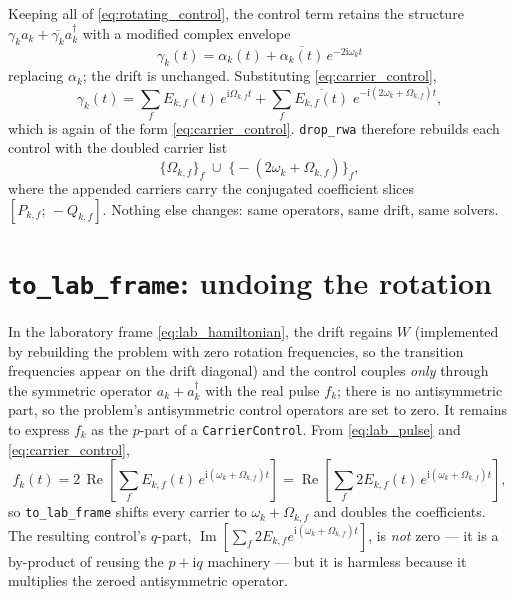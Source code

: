 \documentclass[11pt]{article}
\newcommand{\ii}{\mathrm{i}}
\renewcommand{\Re}{\operatorname{Re}}
\renewcommand{\Im}{\operatorname{Im}}
\newcommand{\code}[1]{\texttt{#1}}
\begin{document}
Keeping all of \eqref{eq:rotating_control}, the control term retains the
structure $\gamma_k a_k + \overline{\gamma_k} a_k^\dagger$ with a modified
complex envelope
\begin{equation} \label{eq:gamma}
    \boxed{\;
    \gamma_k(t) = \alpha_k(t) + \overline{\alpha_k(t)}\, e^{-2\ii\omega_k t}
    \;}
\end{equation}
replacing $\alpha_k$; the drift is unchanged.  Substituting
\eqref{eq:carrier_control},
\begin{equation}
    \gamma_k(t)
    = \sum_f E_{k,f}(t)\, e^{\ii \Omega_{k,f} t}
    + \sum_f \overline{E_{k,f}(t)}\; e^{-\ii (2\omega_k + \Omega_{k,f}) t},
\end{equation}
which is again of the form \eqref{eq:carrier_control}.  \code{drop\_rwa}
therefore rebuilds each control with the doubled carrier list
\begin{equation}
    \bigl\{\Omega_{k,f}\bigr\}_f \;\cup\;
    \bigl\{-(2\omega_k + \Omega_{k,f})\bigr\}_f ,
\end{equation}
where the appended carriers carry the conjugated coefficient slices
$[P_{k,f};\, -Q_{k,f}]$.  Nothing else changes: same operators, same drift,
same solvers.

\section{\code{to\_lab\_frame}: undoing the rotation}

In the laboratory frame \eqref{eq:lab_hamiltonian}, the drift regains $W$
(implemented by rebuilding the problem with zero rotation frequencies, so the
transition frequencies appear on the drift diagonal) and the control couples
\emph{only} through the symmetric operator $a_k + a_k^\dagger$ with the real
pulse $f_k$; there is no antisymmetric part, so the problem's antisymmetric
control operators are set to zero.  It remains to express $f_k$ as the
$p$-part of a \code{CarrierControl}.  From \eqref{eq:lab_pulse} and
\eqref{eq:carrier_control},
\begin{equation}
    f_k(t)
    = 2\,\Re\!\left[\sum_f E_{k,f}(t)\, e^{\ii(\omega_k + \Omega_{k,f}) t}\right]
    = \Re\!\left[\sum_f 2E_{k,f}(t)\, e^{\ii(\omega_k + \Omega_{k,f}) t}\right],
\end{equation}
so \code{to\_lab\_frame} shifts every carrier to $\omega_k + \Omega_{k,f}$ and
doubles the coefficients.  The resulting control's $q$-part,
$\Im[\sum_f 2E_{k,f} e^{\ii(\omega_k+\Omega_{k,f})t}]$, is \emph{not} zero ---
it is a by-product of reusing the $p + \ii q$ machinery --- but it is
harmless because it multiplies the zeroed antisymmetric operator.
\end{document}
